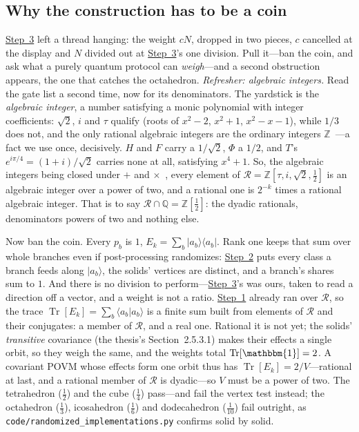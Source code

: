 \documentclass[11pt,a4paper]{article}
\DeclareMathOperator{\Tr}{Tr}
\newcommand{\Id}{\mathbbm{1}}
\newcommand{\phig}{\tau}      %
\newcommand{\ket}[1]{|#1\rangle}
\newcommand{\braket}[2]{\langle#1|#2\rangle}
\newcommand{\ketbra}[2]{|#1\rangle\langle#2|}
\begin{document}
\subsection{Why the construction has to be a coin}

\hyperref[sec:decker:step3]{Step~3} left a thread hanging: the weight $cN$, dropped in two pieces, $c$ cancelled at the display and $N$ divided out at \hyperref[sec:decker:step3]{Step~3}'s one division. Pull it---ban the coin, and ask what a purely quantum protocol can \textit{weigh}---and a second obstruction appears, the one that catches the octahedron. \textit{Refresher: algebraic integers.} Read the gate list a second time, now for its denominators. The yardstick is the \textit{algebraic integer}, a number satisfying a monic polynomial with integer coefficients: $\sqrt{2}$, $i$ and $\phig$ qualify (roots of $x^2-2$, $x^2+1$, $x^2-x-1$), while $1/3$ does not, and the only rational algebraic integers are the ordinary integers $\mathbb{Z}$~\cite[Lem.~13.1.1 and Exercise~13.1.3(a)]{artin2011algebra}---a fact we use once, decisively. $H$ and $F$ carry a $1/\sqrt{2}$, $\Phi$ a $1/2$, and $T$'s $e^{i\pi/4} = (1+i)/\sqrt{2}$ carries none at all, satisfying $x^4 + 1$. So, the algebraic integers being closed under $+$ and $\times$~\cite[Ex.~14.M.8(c)]{artin2011algebra}, every element of $\mathcal{R} = \mathbb{Z}[\phig, i, \sqrt{2}, \tfrac{1}{2}]$ is an algebraic integer over a power of two, and a rational one is $2^{-k}$ times a rational algebraic integer. That is to say $\mathcal{R} \cap \mathbb{Q} = \mathbb{Z}[\tfrac{1}{2}]$: the dyadic rationals, denominators powers of two and nothing else.

Now ban the coin. Every $p_b$ is $1$, $E_k = \sum_b \ketbra{a_b}{a_b}$. Rank one keeps that sum over whole branches even if post-processing randomizes: \hyperref[sec:decker:step2]{Step~2} puts every class a branch feeds along $\ket{a_b}$, the solids' vertices are distinct, and a branch's shares sum to $1$. And there is no division to perform---\hyperref[sec:decker:step3]{Step~3}'s was ours, taken to read a direction off a vector, and a weight is not a ratio. \hyperref[sec:decker:step1]{Step~1} already ran over $\mathcal{R}$, so the trace $\Tr[E_k] = \sum_b \braket{a_b}{a_b}$ is a finite sum built from elements of $\mathcal{R}$ and their conjugates: a member of $\mathcal{R}$, and a real one. Rational it is not yet; the solids' \textit{transitive} covariance (the thesis's Section~2.5.3.1) makes their effects a single orbit, so they weigh the same, and the weights total $\Tr[\Id] = 2$. A covariant POVM whose effects form one orbit thus has $\Tr[E_k] = 2/V$---rational at last, and a rational member of $\mathcal{R}$ is dyadic---so $V$ must be a power of two. The tetrahedron ($\tfrac{1}{2}$) and the cube ($\tfrac{1}{4}$) pass---and fail the vertex test instead; the octahedron ($\tfrac{1}{3}$), icosahedron ($\tfrac{1}{6}$) and dodecahedron ($\tfrac{1}{10}$) fail outright, as \texttt{code/randomized\_implementations.py} confirms solid by solid.
\end{document}
